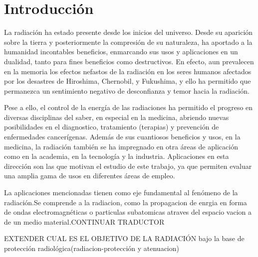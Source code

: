\documentclass[12pt,fleqn]{book} %
\numberwithin{equation}{section} %
\numberwithin{figure}{section} %
\numberwithin{table}{section} %
\begin{document}

\chapter{Introducción}

La radiación ha estado presente desde los inicios del universo. Desde su aparición sobre la tierra y posteriormente la compresión de su naturaleza, ha aportado a la humanidad incontables beneficios, enmarcando sus usos y aplicaciones en un dualidad, tanto para fines beneficios como destructivos.
En efecto, aun prevalecen en la memoria los efectos nefastos de la radiación en los seres humanos afectados por los desastres de Hiroshima, Chernobil, y Fukushima, y ello ha permitido que permanezca un sentimiento negativo de desconfianza y temor hacia la radiación.



Pese a ello, el control de la energía de las radiaciones ha permitido el progreso en diversas disciplinas del saber, en especial en la medicina, abriendo nuevas posibilidades en el diagnostico, tratamiento (terapias) y prevención de enfermedades cancerígenas. Además de sus cuantiosos beneficios y usos, en la medicina, la radiación también se ha impregnado en otra áreas de aplicación  como en la academia, en la tecnología y la industria. Aplicaciones en esta dirección son las que motivan el estudio de este trabajo, ya que permiten evaluar una amplia gama de usos en diferentes áreas de empleo.


La aplicaciones mencionadas tienen como eje fundamental al fenómeno de la radiación.Se comprende a la radiacion, como la propagacion de enrgia en forma de ondas electromagnéticas o particulas subatomicas atraves del espacio vacion a de un medio material.CONTINUAR TRADUCTOR


EXTENDER CUAL ES EL OBJETIVO DE LA RADIACIÓN bajo la base de protección radiológica(radiacion-protección y atenuacion)

\end{document}
